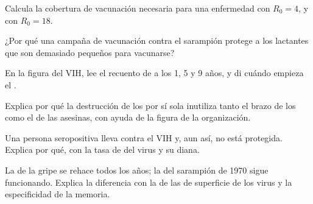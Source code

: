 \begin{exercise}[$\star\star$]\label{exo:g12:adaptive-immunity:9}
Calcula la cobertura de vacunación necesaria para una enfermedad con
$R_0 = 4$, y con $R_0 = 18$.
\end{exercise}

\begin{exercise}[$\star\star$]\label{exo:g12:adaptive-immunity:10}
¿Por qué una campaña de vacunación contra el sarampión protege a los
lactantes que son demasiado pequeños para vacunarse?
\end{exercise}

\begin{exercise}[$\star\star$]\label{exo:g12:adaptive-immunity:11}
En la figura del VIH, lee el recuento de  a
los 1, 5 y 9 años, y di cuándo empieza el .
\end{exercise}

\begin{exercise}[$\star\star\star$]\label{exo:g12:adaptive-immunity:12}
Explica por qué la destrucción de los  por sí
sola inutiliza tanto el brazo de los  como el de las 
asesinas, con ayuda de la figura de la organización.
\end{exercise}

\begin{exercise}[$\star\star\star$]\label{exo:g12:adaptive-immunity:13}
Una persona seropositiva lleva  contra el VIH y, aun así, no
está protegida. Explica por qué, con la tasa de  del virus y su
diana.
\end{exercise}

\begin{exercise}[$\star\star\star$]\label{exo:g12:adaptive-immunity:14}
La  de la gripe se rehace todos los años; la  del sarampión
de 1970 sigue funcionando. Explica la diferencia con la  de las
 de superficie de los virus y la especificidad de la memoria.
\end{exercise}

